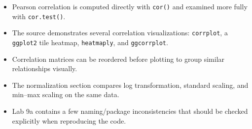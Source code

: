 \begin{chapterrecap}
\begin{itemize}
  \item Pearson correlation is computed directly with \texttt{cor()} and examined more fully with \texttt{cor.test()}.
  \item The source demonstrates several correlation visualizations: \texttt{corrplot}, a \texttt{ggplot2} tile heatmap, \texttt{heatmaply}, and \texttt{ggcorrplot}.
  \item Correlation matrices can be reordered before plotting to group similar relationships visually.
  \item The normalization section compares log transformation, standard scaling, and min--max scaling on the same data.
  \item Lab 9a contains a few naming/package inconsistencies that should be checked explicitly when reproducing the code.
\end{itemize}
\end{chapterrecap}
